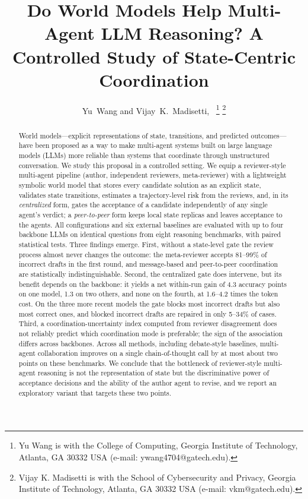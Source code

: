\documentclass[lettersize,journal]{IEEEtran}
\title{Do World Models Help Multi-Agent LLM Reasoning? A Controlled Study of State-Centric Coordination}
\author{
Yu~Wang and Vijay~K.~Madisetti,~\IEEEmembership{Fellow,~IEEE}%
\thanks{Yu Wang is with the College of Computing, Georgia Institute of Technology, Atlanta, GA 30332 USA (e-mail: ywang4704@gatech.edu).}
\thanks{Vijay K. Madisetti is with the School of Cybersecurity and Privacy, Georgia Institute of Technology, Atlanta, GA 30332 USA (e-mail: vkm@gatech.edu).}
}
\begin{document}
\maketitle

\begin{abstract}
World models---explicit representations of state, transitions, and predicted outcomes---have been proposed as a way to make multi-agent systems built on large language models (LLMs) more reliable than systems that coordinate through unstructured conversation.
We study this proposal in a controlled setting. We equip a reviewer-style multi-agent pipeline (author, independent reviewers, meta-reviewer) with a lightweight symbolic world model that stores every candidate solution as an explicit state, validates state transitions, estimates a trajectory-level risk from the reviews, and, in its \emph{centralized} form, gates the acceptance of a candidate independently of any single agent's verdict; a \emph{peer-to-peer} form keeps local state replicas and leaves acceptance to the agents.
All configurations and six external baselines are evaluated with up to four backbone LLMs on identical questions from eight reasoning benchmarks, with paired statistical tests.
Three findings emerge.
First, without a state-level gate the review process almost never changes the outcome: the meta-reviewer accepts 81--99\% of incorrect drafts in the first round, and message-based and peer-to-peer coordination are statistically indistinguishable.
Second, the centralized gate does intervene, but its benefit depends on the backbone: it yields a net within-run gain of 4.3 accuracy points on one model, 1.3 on two others, and none on the fourth, at 1.6--4.2 times the token cost. On the three more recent models the gate blocks most incorrect drafts but also most correct ones, and blocked incorrect drafts are repaired in only 5--34\% of cases.
Third, a coordination-uncertainty index computed from reviewer disagreement does not reliably predict which coordination mode is preferable; the sign of the association differs across backbones.
Across all methods, including debate-style baselines, multi-agent collaboration improves on a single chain-of-thought call by at most about two points on these benchmarks.
We conclude that the bottleneck of reviewer-style multi-agent reasoning is not the representation of state but the discriminative power of acceptance decisions and the ability of the author agent to revise, and we report an exploratory variant that targets these two points.
\end{abstract}
\end{document}

